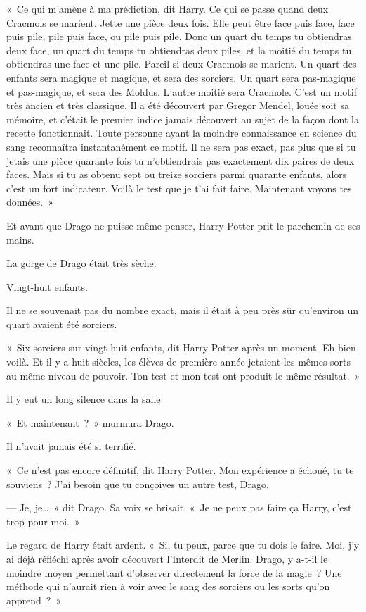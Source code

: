 «~Ce qui m'amène à ma prédiction, dit Harry. Ce qui se passe quand deux Cracmols se marient. Jette une pièce deux fois. Elle peut être face puis face, face puis pile, pile puis face, ou pile puis pile. Donc un quart du temps tu obtiendras deux face, un quart du temps tu obtiendras deux piles, et la moitié du temps tu obtiendras une face et une pile. Pareil si deux Cracmols se marient. Un quart des enfants sera magique et magique, et sera des sorciers. Un quart sera pas-magique et pas-magique, et sera des Moldus. L'autre moitié sera Cracmole. C'est un motif très ancien et très classique. Il a été découvert par Gregor Mendel, louée soit sa mémoire, et c'était le premier indice jamais découvert au sujet de la façon dont la recette fonctionnait. Toute personne ayant la moindre connaissance en science du sang reconnaîtra instantanément ce motif. Il ne sera pas exact, pas plus que si tu jetais une pièce quarante fois tu n'obtiendrais pas exactement dix paires de deux faces. Mais si tu as obtenu sept ou treize sorciers parmi quarante enfants, alors c'est un fort indicateur. Voilà le test que je t'ai fait faire. Maintenant voyons tes données.~»

Et avant que Drago ne puisse même penser, Harry Potter prit le parchemin de ses mains.

La gorge de Drago était très sèche.

Vingt-huit enfants.

Il ne se souvenait pas du nombre exact, mais il était à peu près sûr qu'environ un quart avaient été sorciers.

«~Six sorciers sur vingt-huit enfants, dit Harry Potter après un moment. Eh bien voilà. Et il y a huit siècles, les élèves de première année jetaient les mêmes sorts au même niveau de pouvoir. Ton test et mon test ont produit le même résultat.~»

Il y eut un long silence dans la salle.

«~Et maintenant~?~» murmura Drago.

Il n'avait jamais été si terrifié.

«~Ce n'est pas encore définitif, dit Harry Potter. Mon expérience a échoué, tu te souviens~? J'ai besoin que tu conçoives un autre test, Drago.

--- Je, je…~» dit Drago. Sa voix se brisait. «~Je ne peux pas faire ça Harry, c'est trop pour moi.~»

Le regard de Harry était ardent. «~Si, tu peux, parce que tu dois le faire. Moi, j'y ai déjà réfléchi après avoir découvert l'Interdit de Merlin. Drago, y a-t-il le moindre moyen permettant d'observer directement la force de la magie~? Une méthode qui n'aurait rien à voir avec le sang des sorciers ou les sorts qu'on apprend~?~»

